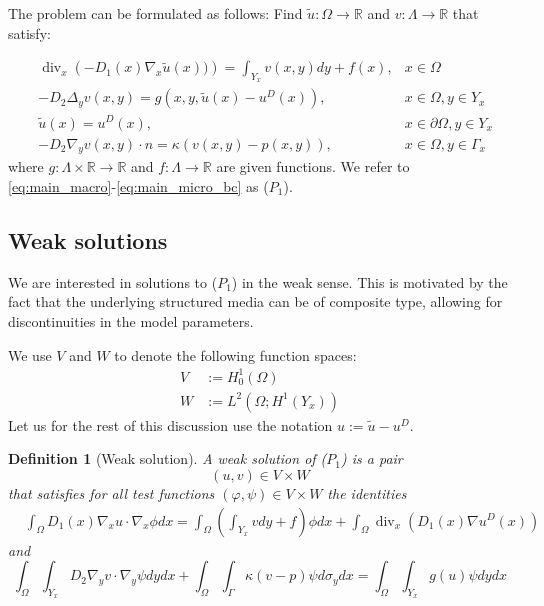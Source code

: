 \documentclass{article}
\newcommand{\R}{\mathbb{ R}}
\newtheorem{defin}{Definition}
\renewcommand{\div}{\operatorname{div}}
\begin{document}
The problem can be formulated as follows: Find  $ \tilde{u}: \Omega \to \R $ and $v: \Lambda\to \R$ that satisfy:

\begin{align}
    \label{eq:main_macro}&\div_x\left( -D_1(x) \nabla_x \tilde{u}(x))\right) = \int_{Y_x} v(x,y) dy + f(x),&x \in \Omega \\
    \label{eq:main_micro}&- D_2 \Delta_y v(x,y) = g(x,y,\tilde{u}(x) - u^D(x)),&  x\in \Omega, y \in Y_x \\
    \label{eq:main_macro_bc}&\tilde{u}(x) = u^D(x), & x\in \partial \Omega,y \in Y_x\\
    \label{eq:main_micro_bc}& - D_2 \nabla_y v(x,y) \cdot n = \kappa(v(x,y) - p(x,y)), &x\in \Omega, y \in \Gamma_x
\end{align}
where  $g: \Lambda \times \R \to \R$ and $f:\Lambda \to \R$ are given functions. We refer to \eqref{eq:main_macro}-\eqref{eq:main_micro_bc} as ($P_1$).

\subsection{Weak solutions}

We are interested in solutions to ($P_1$) in the weak sense. This is motivated by the fact that the underlying structured media can be of composite type, allowing for discontinuities in the model parameters.

We use $V$ and $W$ to denote the following function spaces:
\begin{align*}
    V &:= H^1_0(\Omega)\\
    W &:= L^2 \left( \Omega; H^1(Y_x)\right)
\end{align*}
Let us for the rest of this discussion use the notation $u := \tilde{u} - u^D$.

\begin{defin}[Weak solution]
    A weak solution of ($P_1$) is a pair
    \begin{equation*}
        (u,v)\in V\times W
    \end{equation*}
    that satisfies for all test functions $(\varphi,\psi) \in V\times W$ the identities
\begin{equation}
    \begin{split}
        &\int_\Omega D_1(x) \nabla_x u \cdot \nabla_x \phi dx = \int_\Omega \left( \int_{Y_x} vdy + f \right)\phi dx + \int_\Omega \div_x \left(D_1(x)\nabla u^D(x) \right)
    \end{split}
    \label{eq:weak_macro}
\end{equation}
and
\begin{equation}
    \label{eq:weak_micro}
    \int_\Omega\int_{Y_x} D_2 \nabla_y v \cdot \nabla_y \psi dy dx + \int_\Omega\int_\Gamma \kappa (v - p) \psi d\sigma_y dx
     =\int_\Omega \int_{Y_x} g(u) \psi dy dx
\end{equation}
\end{defin}
\end{document}
